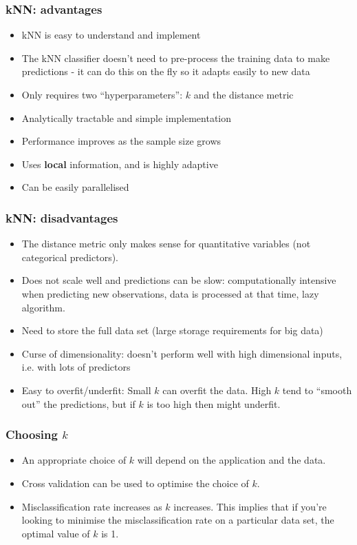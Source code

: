 \documentclass[a4paper]{article}
\begin{document}
\subsubsection{kNN: advantages}
\begin{itemize}
	\item kNN is easy to understand and implement
	\item The kNN classifier doesn't need to pre-process the training data to make predictions - it can do this on the fly so it adapts easily to new data
	\item Only requires two ``hyperparameters'': \( k \) and the distance metric
	\item Analytically tractable and simple implementation
	\item Performance improves as the sample size grows
	\item Uses \textbf{local} information, and is highly adaptive
	\item Can be easily parallelised
\end{itemize}
\subsubsection{kNN: disadvantages}
\begin{itemize}
	\item The distance metric only makes sense for quantitative variables (not categorical predictors).
	\item Does not scale well and predictions can be slow: computationally intensive when predicting new observations, data is processed at that time, lazy algorithm.
	\item Need to store the full data set (large storage requirements for big data)
	\item Curse of dimensionality: doesn't perform well with high dimensional inputs, i.e. with lots of predictors
	\item Easy to overfit/underfit: Small \( k \) can overfit the data. High \( k \) tend to ``smooth out'' the predictions, but if \( k \) is too high then might underfit.
\end{itemize}
\subsubsection{Choosing \( k \)}
\begin{itemize}
	\item An appropriate choice of \( k \) will depend on the application and the data.
	\item Cross validation can be used to optimise the choice of \( k \).
	\item Misclassification rate increases as \( k \) increases. This implies that if you’re looking to minimise the misclassification rate on a particular data set, the optimal value of \( k \) is 1.
\end{itemize}
\end{document}
